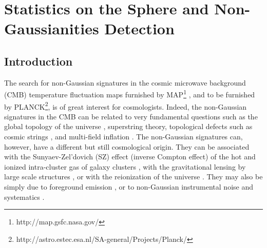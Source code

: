 \chapter{Statistics on the Sphere and Non-Gaussianities Detection}
\label{ch_fluctu}
\section{Introduction}
The search for non-Gaussian signatures in the cosmic microwave background (CMB) temperature fluctuation maps furnished by
MAP\footnote{http://map.gsfc.nasa.gov/} \citep{komatsu2003}, and to be furnished by PLANCK\footnote{http://astro.estec.esa.nl/SA-general/Projects/Planck/},
is of great interest for cosmologists. Indeed, the non-Gaussian signatures in the CMB can be related to very fundamental questions
such as the global topology of the universe \citep{riazuelo2002}, superstring theory, topological defects such as cosmic strings
\citep{gauss:bouchet88}, and multi-field inflation \citep{bernardeau2002}. The non-Gaussian signatures can, however, have a different 
but still cosmological origin. They can be associated with the Sunyaev-Zel'dovich (SZ) effect \citep{sunyaev80} (inverse Compton
effect) of the hot and ionized intra-cluster gas of galaxy clusters \citep{gauss:aghanim99,cooray2001}, with the gravitational 
lensing by large scale structures \citep{threepoint:bernardeau03}, or with the reionization of the universe \citep{gauss:aghanim99,castro2002}. 
They may also be simply due to foreground emission \citep{gauss:jewell01}, or to non-Gaussian instrumental noise and systematics \citep{banday2000}.

